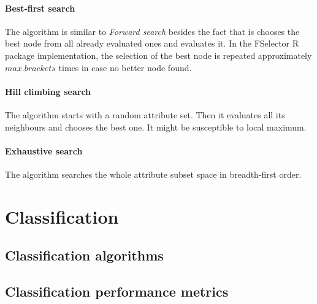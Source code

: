 \documentclass[10pt]{article}\usepackage[]{graphicx}\usepackage[]{color}
\begin{document}
\paragraph{Best-first search}
The algorithm is similar to \textit{Forward search} besides the fact that is chooses the best node from all already evaluated ones and evaluates it. In the FSelector R package implementation, the selection of the best node is repeated approximately $max.brackets$ times in case no better node found. 

\paragraph{Hill climbing search}
The algorithm starts with a random attribute set. Then it evaluates all its neighbours and chooses the best one. It might be susceptible to local maximum.

\paragraph{Exhaustive search}
The algorithm searches the whole attribute subset space in breadth-first order. 












\clearpage
\section{Classification}

\subsection{Classification algorithms}

\subsection{Classification performance metrics}
\end{document}

